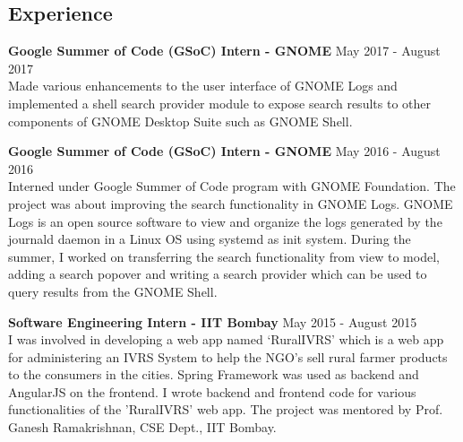 \documentclass[12pt,margin, centered]{res}
\begin{document}
\begin{resume}



\section{Experience}
\vspace{10mm}

\textbf{Google Summer of Code (GSoC) Intern - GNOME} \hfill May 2017 - August 2017\\
Made various enhancements to the user interface of GNOME Logs and implemented a shell search provider module to expose search results to other components of GNOME Desktop Suite such as GNOME Shell.

\vspace{2mm}

\textbf{Google Summer of Code (GSoC) Intern - GNOME} \hfill May 2016 - August 2016\\
Interned under Google Summer of Code program with GNOME Foundation. The project was about improving the search functionality in GNOME Logs. GNOME Logs is an open source software to view and organize the logs generated by the journald daemon in a Linux OS using systemd as init system. During the summer, I worked on transferring the search functionality from view to model, adding a search popover and writing a search provider which can be used to query results from the GNOME Shell.

\vspace{2mm}

\textbf{Software Engineering Intern - IIT Bombay} \hfill May 2015 - August 2015\\
I was involved in developing a web app named ‘RuralIVRS’ which is a web app for administering an IVRS System to help the NGO's sell rural farmer products to the consumers in the cities. Spring Framework was used as backend and AngularJS on the frontend. I wrote backend and frontend code for various functionalities of the 'RuralIVRS' web app. The project was mentored by Prof. Ganesh Ramakrishnan, CSE Dept., IIT Bombay.




\end{resume}
\end{document}
